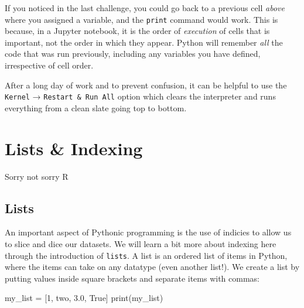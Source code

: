 \documentclass[
  letterpaper,
  DIV=11,
  numbers=noendperiod]{scrreprt}
\newenvironment{Shaded}{\begin{snugshade}}{\end{snugshade}}
\newcommand{\BuiltInTok}[1]{\textcolor[rgb]{0.00,0.23,0.31}{#1}}
\newcommand{\DecValTok}[1]{\textcolor[rgb]{0.68,0.00,0.00}{#1}}
\newcommand{\FloatTok}[1]{\textcolor[rgb]{0.68,0.00,0.00}{#1}}
\newcommand{\NormalTok}[1]{\textcolor[rgb]{0.00,0.23,0.31}{#1}}
\newcommand{\OperatorTok}[1]{\textcolor[rgb]{0.37,0.37,0.37}{#1}}
\newcommand{\StringTok}[1]{\textcolor[rgb]{0.13,0.47,0.30}{#1}}
\newcommand{\VariableTok}[1]{\textcolor[rgb]{0.07,0.07,0.07}{#1}}
\begin{document}
\begin{tcolorbox}[enhanced jigsaw, rightrule=.15mm, opacitybacktitle=0.6, colback=white, toprule=.15mm, colframe=quarto-callout-tip-color-frame, bottomtitle=1mm, bottomrule=.15mm, arc=.35mm, coltitle=black, breakable, title=\textcolor{quarto-callout-tip-color}{\faLightbulb}\hspace{0.5em}{Jupyter Notebooks: Order of Execution}, titlerule=0mm, opacityback=0, colbacktitle=quarto-callout-tip-color!10!white, left=2mm, toptitle=1mm, leftrule=.75mm]
If you noticed in the last challenge, you could go back to a previous
cell \emph{above} where you assigned a variable, and the \texttt{print}
command would work. This is because, in a Jupyter notebook, it is the
order of \emph{execution} of cells that is important, not the order in
which they appear. Python will remember \emph{all} the code that was run
previously, including any variables you have defined, irrespective of
cell order.

After a long day of work and to prevent confusion, it can be helpful to
use the \texttt{Kernel} → \texttt{Restart\ \&\ Run\ All} option which
clears the interpreter and runs everything from a clean slate going top
to bottom.
\end{tcolorbox}

\hypertarget{lists-indexing}{%
\section{Lists \& Indexing}\label{lists-indexing}}

Sorry not sorry R

\hypertarget{lists}{%
\subsection{Lists}\label{lists}}

An important aspect of Pythonic programming is the use of indicies to
allow us to slice and dice our datasets. We will learn a bit more about
indexing here through the introduction of \texttt{lists}. A list is an
ordered list of items in Python, where the items can take on any
datatype (even another list!). We create a list by putting values inside
square brackets and separate items with commas:

\begin{Shaded}
\begin{Highlighting}[]
\NormalTok{my\_list }\OperatorTok{=}\NormalTok{ [}\DecValTok{1}\NormalTok{, }\StringTok{\textquotesingle{}two\textquotesingle{}}\NormalTok{, }\FloatTok{3.0}\NormalTok{, }\VariableTok{True}\NormalTok{]}
\BuiltInTok{print}\NormalTok{(my\_list)}
\end{Highlighting}
\end{Shaded}
\end{document}
